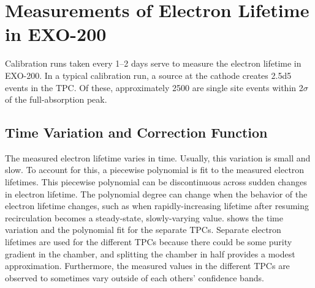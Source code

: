 \documentclass[herrin-thesis.tex]{subfiles}
\begin{document}
\section{Measurements of Electron Lifetime in EXO-200}

Calibration runs taken every 1--2 days serve to measure the electron lifetime in EXO-200. In a typical calibration run, a  source at the cathode creates \num{2.5d5} events in the TPC. Of these, approximately 2500 are single site events within 2\(\sigma\) of the full-absorption peak.

\subsection{Time Variation and Correction Function}

The measured electron lifetime varies in time. Usually, this variation is small and slow. To account for this, a piecewise polynomial is fit to the measured electron lifetimes. This piecewise polynomial can be discontinuous across sudden changes in electron lifetime. The polynomial degree can change when the behavior of the electron lifetime changes, such as when rapidly-increasing lifetime after resuming recirculation becomes a steady-state, slowly-varying value.  shows the time variation and the polynomial fit for the separate TPCs. Separate electron lifetimes are used for the different TPCs because there could be some purity gradient in the chamber, and splitting the chamber in half provides a modest approximation. Furthermore, the measured values in the different TPCs are observed to sometimes vary outside of each others' confidence bands.
\end{document}
